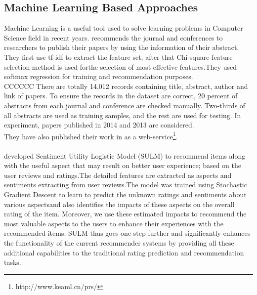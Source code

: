 \subsection{Machine Learning Based Approaches}
Machine Learning is a useful tool used to solve learning problems in Computer Science field in recent years.
\cite{N5} recommends the journal and conferences to researchers to publish their papers by using the information of their abstract. They first use tf-idf to extract the feature set, after that Chi-square feature selection method is used forthe selection of most effective features.They used softmax regression for training and recommendation purposes.
\\CCCCCC There are totally 14,012 records containing title, abstract, author and link of papers. To ensure the records in the dataset are correct, 20 percent of abstracts from each journal and conference are checked manually. Two-thirds of all abstracts are used as training samples, and the rest are used for testing. In experiment, papers published in 2014 and 2013 are considered.
\\They have also published their work in as a web-service\footnote{http://www.keaml.cn/prs/}.
\\
\\
\cite{27}developed Sentiment Utility Logistic Model (SULM) to recommend items along with the useful aspect that may result on better user experience; based on the user reviews and ratings.The detailed features are extracted as aspects and sentiments extracting from user reviews.The model was trained using Stochastic Gradient Descent to learn to predict the unknown ratings and sentiments about various aspectsand also identifies the impacts of these aspects on the overall rating of the item. Moreover, we use these estimated impacts to recommend the most valuable aspects to the users to enhance their experiences with the recommended items. SULM thus goes one step further and significantly enhances the functionality of the current recommender systems by providing all these additional capabilities to the traditional rating prediction and recommendation tasks.